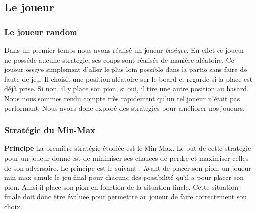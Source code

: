 \documentclass[12pt]{article}
\begin{document}
\subsection{Le joueur}
\subsubsection{Le joueur random}

Dans un premier temps nous avons réalisé un joueur \textit{basique}. En effet ce joueur ne posséde aucune stratégie, ses coups sont réalisés de manière aléatoire.
Ce joueur essaye simplement d'aller le plus loin possible dans la partie sans faire de faute de jeu. Il choisit une position aléatoire sur le board et regarde si la place est déjà prise. Si non, il y place son pion, si oui, il tire une autre position au hasard.
Nous nous sommes rendu compte très rapidement qu'un tel joueur n'était pas performant. Nous avons donc exploré des stratégies pour améliorer nos joueurs.
\subsubsection{Stratégie du Min-Max}
\textbf{Principe}\newline
La première stratégie étudiée est le Min-Max. Le but de cette stratégie pour un joueur donné est de minimiser ses chances de perdre et maximiser celles de son adversaire. Le principe est le suivant :
Avant de placer son pion, un joueur min-max simule le jeu final pour chacune des possibilité qu'il a pour placer son pion. Ainsi il place son pion en fonction de la situation finale. Cette situation finale doit donc être évaluée pour permettre au joueur de faire correctement son choix.
\newline
\end{document}
